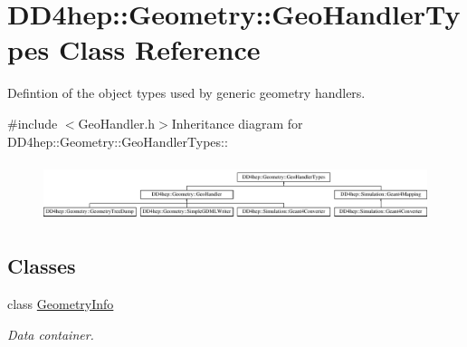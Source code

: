 \hypertarget{class_d_d4hep_1_1_geometry_1_1_geo_handler_types}{
\section{DD4hep::Geometry::GeoHandlerTypes Class Reference}
\label{class_d_d4hep_1_1_geometry_1_1_geo_handler_types}
}


Defintion of the object types used by generic geometry handlers.  


{\ttfamily \#include $<$GeoHandler.h$>$}Inheritance diagram for DD4hep::Geometry::GeoHandlerTypes::\begin{figure}[H]
\begin{center}
\leavevmode
\includegraphics[height=1.72131cm]{class_d_d4hep_1_1_geometry_1_1_geo_handler_types}
\end{center}
\end{figure}
\subsection*{Classes}
\begin{DoxyCompactItemize}
\item 
class \hyperlink{class_d_d4hep_1_1_geometry_1_1_geo_handler_types_1_1_geometry_info}{GeometryInfo}
\begin{DoxyCompactList}\small\item\em Data container. \item\end{DoxyCompactList}\end{DoxyCompactItemize}
